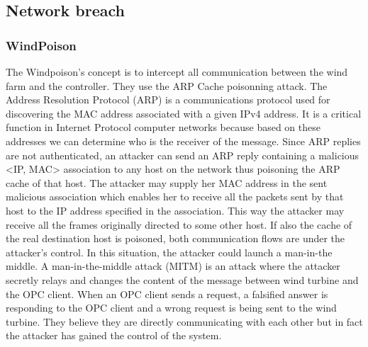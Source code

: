 \documentclass[twosided,a4,10pt]{article}
\begin{document}
\begin{multicols}{2}
\subsection{Network breach}

\subsubsection{WindPoison}
The Windpoison’s concept is to intercept all communication between the wind farm and the controller. They use the ARP Cache poisonning attack. The Address Resolution Protocol (ARP) is a communications protocol used for discovering the MAC address associated with a given IPv4 address. It is a critical function in Internet Protocol computer networks because based on these addresses we can determine who is the receiver of the message.
 \newline Since ARP replies are not authenticated, an attacker can send an ARP reply containing a malicious <IP, MAC> association to any host on the network thus poisoning the ARP cache of that host. The attacker may supply her MAC address in the sent malicious association which enables her to receive all the packets sent by that host to the IP address specified in the association. This way the attacker may receive all the frames originally directed to some other host. If also the cache of the real destination host is poisoned, both communication flows are under the attacker's control. \newline
In this situation, the attacker could launch a man-in-the middle. A man-in-the-middle attack (MITM) is an attack where the attacker secretly relays and changes the content of the message between wind turbine and the OPC client. When an OPC client sends a request, a falsified answer is responding to the OPC client and a wrong request is being sent to the wind turbine.  They believe they are directly communicating with each other but in fact the attacker has gained the control of the system. 



\end{multicols}
\end{document}

